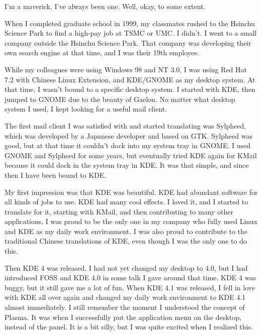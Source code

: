 


\noindent{}I'm a maverick. I've always been one. Well, okay, to some extent.

When I completed graduate school in 1999, my classmates
rushed to the Hsinchu Science Park to find a high-pay job at TSMC
or UMC. I didn't. I went to a small company outside the Hsinchu Science
Park. That company was developing their own search engine at that time,
and I was their 19th employee.

While my colleagues were using Windows 98 and NT 3.0, I was using Red Hat
7.2 with Chinese Linux Extension, and KDE/GNOME as my desktop system.
At that time, I wasn't bound to a specific desktop system. I started
with KDE, then jumped to GNOME due to the beauty of Gaelon. No matter what 
desktop system I used, I kept looking for a useful mail client.

The first mail client I was satisfied with and started translating was
Sylpheed, which was developed by a Japanese developer and based on
GTK. Sylpheed was good, but at that time it couldn't dock into my system
tray in GNOME. I used GNOME and Sylpheed for some years, but eventually 
tried KDE again for KMail because it could dock in the system tray in KDE. 
It was that simple, and since then I have been bound to KDE.

My first impression was that KDE was beautiful. KDE had abundant software for all kinds of jobs
to use. KDE had many cool effects. I loved it, and I started to translate
for it, starting with KMail, and then contributing to many other applications. I was proud to
be the only one in my company who fully used Linux and KDE as my daily
work environment. I was also proud to contribute to the traditional
Chinese translations of KDE, even though I was the only one to do
this.

Then KDE 4 was released. I had not yet changed my desktop to 4.0,
but I had introduced FOSS and KDE 4.0 in some talk I gave around that time. KDE 4
was buggy, but it still gave me a lot of fun. When KDE 4.1 was released, I
fell in love with KDE all over again and changed my daily work environment to
KDE 4.1 almost immediately. I still remember the moment I understood
the concept of Plasma. It was when I successfully put the application
menu on the desktop, instead of the panel. It is a bit silly,
but I was quite excited when I realized this.

